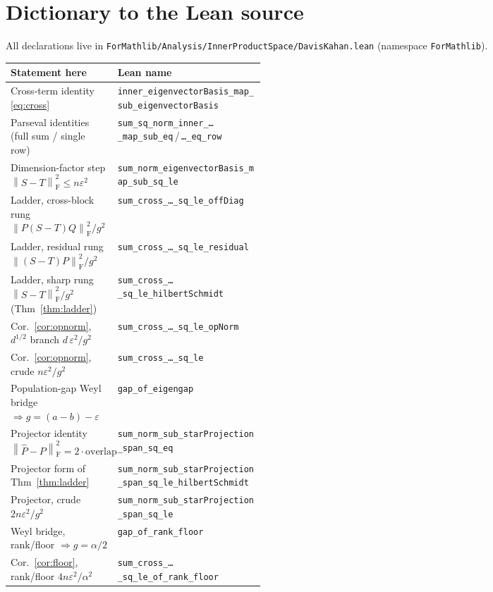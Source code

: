 \documentclass[11pt]{article}
\newcommand{\norm}[1]{\left\lVert #1\right\rVert}
\newcommand{\eps}{\varepsilon}
\newcommand{\F}{\mathrm{F}}
\newcommand{\gap}{g}
\theoremstyle{remark}
\begin{document}
\section{Dictionary to the Lean source}

All declarations live in
\texttt{ForMathlib/Analysis/InnerProductSpace/DavisKahan.lean}
(namespace \texttt{ForMathlib}).

\begin{center}
\footnotesize
\setlength{\tabcolsep}{4pt}
\begin{tabular}{@{}p{0.42\linewidth}l@{}}
\toprule
Statement here & Lean name \\
\midrule
Cross-term identity \eqref{eq:cross}
  & \texttt{inner\_eigenvectorBasis\_map\_sub\_eigenvectorBasis} \\
Parseval identities (full sum / single row)
  & \texttt{sum\_sq\_norm\_inner\_\dots\_map\_sub\_eq}\,/\,\texttt{\dots\_eq\_row} \\
Dimension-factor step $\norm{S-T}_{\F}^2\le n\eps^2$
  & \texttt{sum\_norm\_eigenvectorBasis\_map\_sub\_sq\_le} \\
Ladder, cross-block rung $\norm{P(S-T)Q}_{\F}^2/\gap^2$
  & \texttt{sum\_cross\_\dots\_sq\_le\_offDiag} \\
Ladder, residual rung $\norm{(S-T)P}_{\F}^2/\gap^2$
  & \texttt{sum\_cross\_\dots\_sq\_le\_residual} \\
Ladder, sharp rung $\norm{S-T}_{\F}^2/\gap^2$ (Thm~\ref{thm:ladder})
  & \texttt{sum\_cross\_\dots\_sq\_le\_hilbertSchmidt} \\
Cor.~\ref{cor:opnorm}, $d^{1/2}$ branch $d\,\eps^2/\gap^2$
  & \texttt{sum\_cross\_\dots\_sq\_le\_opNorm} \\
Cor.~\ref{cor:opnorm}, crude $n\eps^2/\gap^2$
  & \texttt{sum\_cross\_\dots\_sq\_le} \\
Population-gap Weyl bridge $\Rightarrow\gap=(a-b)-\eps$
  & \texttt{gap\_of\_eigengap} \\
Projector identity $\norm{\widehat P-P}_{\F}^2=2\cdot\text{overlap}$
  & \texttt{sum\_norm\_sub\_starProjection\_span\_sq\_eq} \\
Projector form of Thm~\ref{thm:ladder}
  & \texttt{sum\_norm\_sub\_starProjection\_span\_sq\_le\_hilbertSchmidt} \\
Projector, crude $2n\eps^2/\gap^2$
  & \texttt{sum\_norm\_sub\_starProjection\_span\_sq\_le} \\
Weyl bridge, rank/floor $\Rightarrow\gap=\alpha/2$
  & \texttt{gap\_of\_rank\_floor} \\
Cor.~\ref{cor:floor}, rank/floor $4n\eps^2/\alpha^2$
  & \texttt{sum\_cross\_\dots\_sq\_le\_of\_rank\_floor} \\
\bottomrule
\end{tabular}
\end{center}
\end{document}

